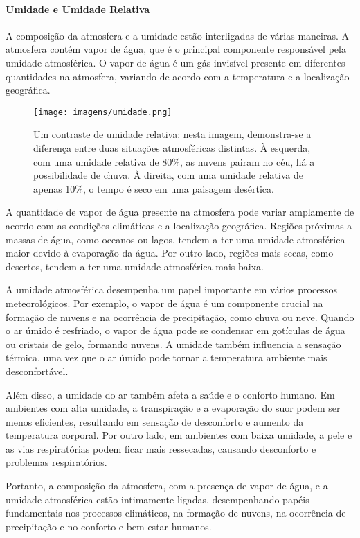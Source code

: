 \documentclass[a4paper, 12pt, onecolumn,singlespacing]{article}
\begin{document}
	\paragraph{Umidade e Umidade Relativa} A composição da atmosfera e a umidade estão interligadas de várias maneiras. A atmosfera contém vapor de água, que é o principal componente responsável pela umidade atmosférica. O vapor de água é um gás invisível presente em diferentes quantidades na atmosfera, variando de acordo com a temperatura e a localização geográfica.
	
	\begin{figure}[h]
		\centering
		\texttt{[image: imagens/umidade.png]}
		\caption{Um contraste de umidade relativa: nesta imagem, demonstra-se a diferença entre duas situações atmosféricas distintas. À esquerda, com uma umidade relativa de 80\%, as nuvens pairam no céu, há a possibilidade de chuva. À direita, com uma umidade relativa de apenas 10\%, o tempo é seco em uma paisagem desértica.}
		\label{fig:umidade_atmosfera}
	\end{figure}
	
	A quantidade de vapor de água presente na atmosfera pode variar amplamente de acordo com as condições climáticas e a localização geográfica. Regiões próximas a massas de água, como oceanos ou lagos, tendem a ter uma umidade atmosférica maior devido à evaporação da água. Por outro lado, regiões mais secas, como desertos, tendem a ter uma umidade atmosférica mais baixa.
	
	A umidade atmosférica desempenha um papel importante em vários processos meteorológicos. Por exemplo, o vapor de água é um componente crucial na formação de nuvens e na ocorrência de precipitação, como chuva ou neve. Quando o ar úmido é resfriado, o vapor de água pode se condensar em gotículas de água ou cristais de gelo, formando nuvens. A umidade também influencia a sensação térmica, uma vez que o ar úmido pode tornar a temperatura ambiente mais desconfortável.
	
	Além disso, a umidade do ar também afeta a saúde e o conforto humano. Em ambientes com alta umidade, a transpiração e a evaporação do suor podem ser menos eficientes, resultando em sensação de desconforto e aumento da temperatura corporal. Por outro lado, em ambientes com baixa umidade, a pele e as vias respiratórias podem ficar mais ressecadas, causando desconforto e problemas respiratórios.
	
	Portanto, a composição da atmosfera, com a presença de vapor de água, e a umidade atmosférica estão intimamente ligadas, desempenhando papéis fundamentais nos processos climáticos, na formação de nuvens, na ocorrência de precipitação e no conforto e bem-estar humanos.
	
\end{document}
